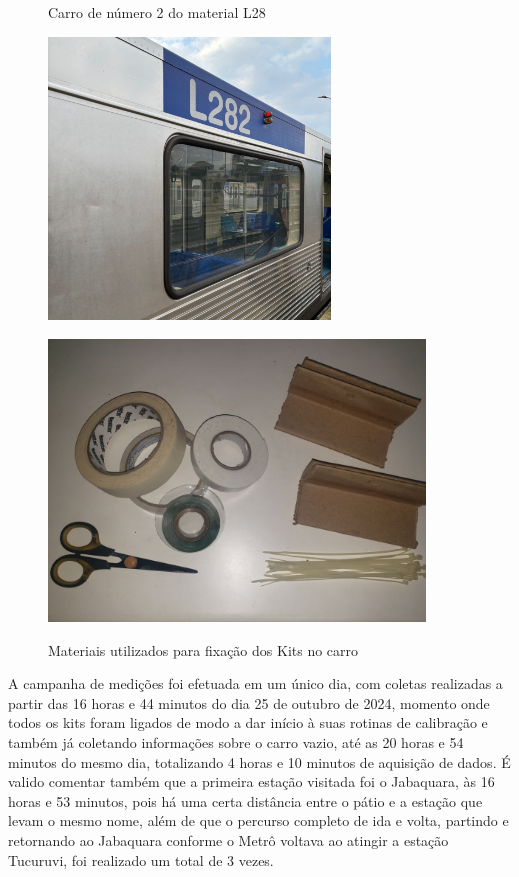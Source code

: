 \documentclass[acronym,symbols,table]{fei}
\begin{document}
\begin{figure}[!htp] 
    \centering
    \begin{minipage}{0.45\textwidth}
        \caption{Carro de número 2 do material L28}
        \includegraphics[width=\linewidth, height=7.5cm]{Imagens/metrol282.jpg} 
        \label{fig:metrol282}
    \end{minipage}\hfill
    \begin{minipage}{0.45\textwidth}
        \caption{Materiais utilizados para fixação dos Kits no carro}
        \includegraphics[width=\linewidth, height=7.5cm]{Imagens/matusados.jpeg} 
        \label{fig:matusados}
    \end{minipage}
\end{figure}

A campanha de medições foi efetuada em um único dia, com coletas realizadas a partir das 16 horas e 44 minutos do dia 25 de outubro de 2024, momento onde todos os kits foram ligados de modo a dar início à suas rotinas de calibração e também já coletando informações sobre o carro vazio, até as 20 horas e 54 minutos do mesmo dia, totalizando 4 horas e 10 minutos de aquisição de dados. É valido comentar também que a primeira estação visitada foi o Jabaquara, às 16 horas e 53 minutos, pois há uma certa distância entre o pátio e a estação que levam o mesmo nome, além de que o percurso completo de ida e volta, partindo e retornando ao Jabaquara conforme o Metrô voltava ao atingir a estação Tucuruvi, foi realizado um total de 3 vezes.
\end{document}
